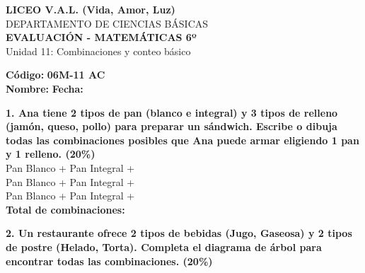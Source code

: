 \documentclass[12pt, letterpaper]{article}
\begin{document}
	
\begin{center}
	{\Large \textbf{LICEO V.A.L. (Vida, Amor, Luz)}}\\[0.1cm]
	{\large DEPARTAMENTO DE CIENCIAS BÁSICAS}\\[0.1cm]
	\textbf{EVALUACIÓN - MATEMÁTICAS 6º}\\[0.1cm]
	Unidad 11: Combinaciones y conteo básico
\end{center}


\hfill \textbf{Código:} \textbf{06M-11 AC}\\

\noindent \textbf{Nombre:} \underline{\hspace{8cm}} \hspace{1cm}\textbf{Fecha:} \underline{\hspace{3cm}}

\vspace{0.6cm}

	
	\noindent \textbf{1. Ana tiene 2 tipos de pan (blanco e integral) y 3 tipos de relleno (jamón, queso, pollo) para preparar un sándwich. Escribe o dibuja todas las combinaciones posibles que Ana puede armar eligiendo 1 pan y 1 relleno. (20\%)} \\
	
	
	\vspace{0.3cm}
	\noindent
	Pan Blanco + \underline{\hspace{4cm}} \hspace{1cm} Pan Integral + \underline{\hspace{4cm}} \\
	Pan Blanco + \underline{\hspace{4cm}} \hspace{1cm} Pan Integral + \underline{\hspace{4cm}} \\
	Pan Blanco + \underline{\hspace{4cm}} \hspace{1cm} Pan Integral + \underline{\hspace{4cm}} \\
	
	\vspace{0.2cm}
	\noindent \textbf{Total de combinaciones:} \underline{\hspace{2cm}}
	\vspace{0.8cm}
	
	\noindent \textbf{2. Un restaurante ofrece 2 tipos de bebidas (Jugo, Gaseosa) y 2 tipos de postre (Helado, Torta). Completa el diagrama de árbol para encontrar todas las combinaciones. (20\%)} \\
	
\end{document}
